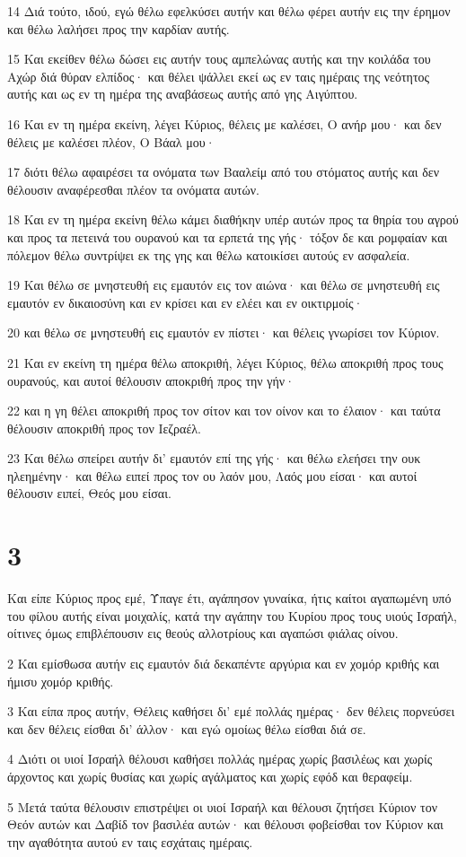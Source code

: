 \par 14 Διά τούτο, ιδού, εγώ θέλω εφελκύσει αυτήν και θέλω φέρει αυτήν εις την έρημον και θέλω λαλήσει προς την καρδίαν αυτής.
\par 15 Και εκείθεν θέλω δώσει εις αυτήν τους αμπελώνας αυτής και την κοιλάδα του Αχώρ διά θύραν ελπίδος· και θέλει ψάλλει εκεί ως εν ταις ημέραις της νεότητος αυτής και ως εν τη ημέρα της αναβάσεως αυτής από γης Αιγύπτου.
\par 16 Και εν τη ημέρα εκείνη, λέγει Κύριος, θέλεις με καλέσει, Ο ανήρ μου· και δεν θέλεις με καλέσει πλέον, Ο Βάαλ μου·
\par 17 διότι θέλω αφαιρέσει τα ονόματα των Βααλείμ από του στόματος αυτής και δεν θέλουσιν αναφέρεσθαι πλέον τα ονόματα αυτών.
\par 18 Και εν τη ημέρα εκείνη θέλω κάμει διαθήκην υπέρ αυτών προς τα θηρία του αγρού και προς τα πετεινά του ουρανού και τα ερπετά της γής· τόξον δε και ρομφαίαν και πόλεμον θέλω συντρίψει εκ της γης και θέλω κατοικίσει αυτούς εν ασφαλεία.
\par 19 Και θέλω σε μνηστευθή εις εμαυτόν εις τον αιώνα· και θέλω σε μνηστευθή εις εμαυτόν εν δικαιοσύνη και εν κρίσει και εν ελέει και εν οικτιρμοίς·
\par 20 και θέλω σε μνηστευθή εις εμαυτόν εν πίστει· και θέλεις γνωρίσει τον Κύριον.
\par 21 Και εν εκείνη τη ημέρα θέλω αποκριθή, λέγει Κύριος, θέλω αποκριθή προς τους ουρανούς, και αυτοί θέλουσιν αποκριθή προς την γήν·
\par 22 και η γη θέλει αποκριθή προς τον σίτον και τον οίνον και το έλαιον· και ταύτα θέλουσιν αποκριθή προς τον Ιεζραέλ.
\par 23 Και θέλω σπείρει αυτήν δι' εμαυτόν επί της γής· και θέλω ελεήσει την ουκ ηλεημένην· και θέλω ειπεί προς τον ου λαόν μου, Λαός μου είσαι· και αυτοί θέλουσιν ειπεί, Θεός μου είσαι.

\chapter{3}

\par Και είπε Κύριος προς εμέ, Ύπαγε έτι, αγάπησον γυναίκα, ήτις καίτοι αγαπωμένη υπό του φίλου αυτής είναι μοιχαλίς, κατά την αγάπην του Κυρίου προς τους υιούς Ισραήλ, οίτινες όμως επιβλέπουσιν εις θεούς αλλοτρίους και αγαπώσι φιάλας οίνου.
\par 2 Και εμίσθωσα αυτήν εις εμαυτόν διά δεκαπέντε αργύρια και εν χομόρ κριθής και ήμισυ χομόρ κριθής.
\par 3 Και είπα προς αυτήν, Θέλεις καθήσει δι' εμέ πολλάς ημέρας· δεν θέλεις πορνεύσει και δεν θέλεις είσθαι δι' άλλον· και εγώ ομοίως θέλω είσθαι διά σε.
\par 4 Διότι οι υιοί Ισραήλ θέλουσι καθήσει πολλάς ημέρας χωρίς βασιλέως και χωρίς άρχοντος και χωρίς θυσίας και χωρίς αγάλματος και χωρίς εφόδ και θεραφείμ.
\par 5 Μετά ταύτα θέλουσιν επιστρέψει οι υιοί Ισραήλ και θέλουσι ζητήσει Κύριον τον Θεόν αυτών και Δαβίδ τον βασιλέα αυτών· και θέλουσι φοβείσθαι τον Κύριον και την αγαθότητα αυτού εν ταις εσχάταις ημέραις.

